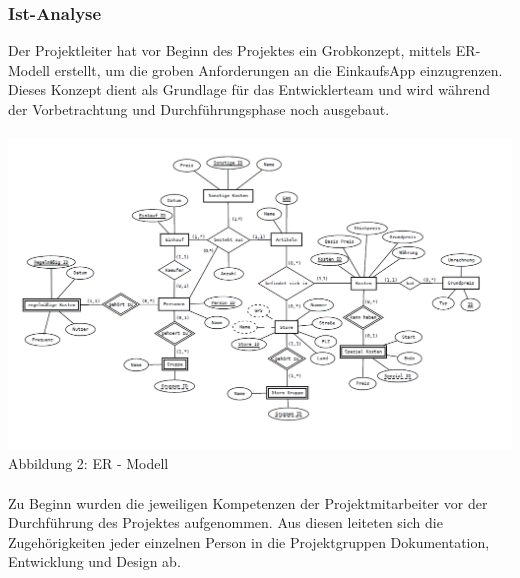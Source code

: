\documentclass[12pt,a4paper]{article}
\begin{document}
\subsubsection{Ist-Analyse}
Der Projektleiter hat vor Beginn des Projektes ein Grobkonzept, mittels ER-Modell erstellt, um die groben Anforderungen an die EinkaufsApp einzugrenzen. 
Dieses Konzept dient als Grundlage für das Entwicklerteam und wird während der Vorbetrachtung und Durchführungsphase noch ausgebaut.
\\
\\
\includegraphics[scale=0.6,origin=l]{EER-Modell.PNG}
\\
\footnotesize Abbildung 2: ER - Modell
\normalsize
\\
\\
Zu Beginn wurden die jeweiligen Kompetenzen der Projektmitarbeiter vor der Durchführung des Projektes aufgenommen. 
Aus diesen leiteten sich die Zugehörigkeiten jeder einzelnen Person in die Projektgruppen Dokumentation, Entwicklung und Design ab. %
\\
\\
\end{document}
